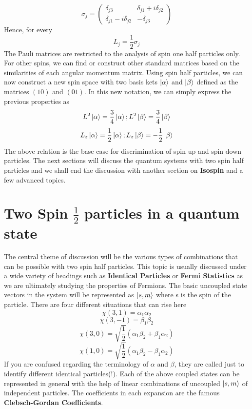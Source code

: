 \documentclass[12pt]{article}
\begin{document}
$$
\sigma_j = 
\begin{pmatrix} 
  \delta_{j3}     & \delta_{j1}+i\delta_{j2}\\ 
  \delta_{j1}-i\delta_{j2} & -\delta_{j3} 
\end{pmatrix}
$$
Hence, for every $$L_j = \frac{1}{2}\sigma_j$$ The Pauli matrices are restricted to the analysis of spin one half particles only. For other spins, we can find or construct other standard matrices based on the similarities of each angular momentum matrix. Using spin half particles, we can now construct a new spin space with two basis kets $\Ket{\alpha}$ and $\Ket{\beta}$ defined as the matrices $(1 0)$ and $(0 1)$. In this new notation, we can simply express the previous properties as $$L^2\Ket{\alpha} = \frac{3}{4}\Ket{\alpha} ; L^2\Ket{\beta} = \frac{3}{4}\Ket{\beta}$$
$$L_z\Ket{\alpha} = \frac{1}{2}\Ket{\alpha} ; L_z\Ket{\beta} = -\frac{1}{2}\Ket{\beta}$$ The above relation is the base case for discrimination of spin up and spin down particles. The next sections will discuss the quantum systems with two spin half particles and we shall end the discussion with another section on \textbf{Isospin} and a few advanced topics.

\section{Two Spin $\frac{1}{2}$ particles in a quantum state}

The central theme of discussion will be the various types of combinations that can be possible with two spin half particles. This topic is usually discussed under a wide variety of headings such as \textbf{Identical Particles} or \textbf{Fermi Statistics} as we are ultimately studying the properties of Fermions. The basic uncoupled state vectors in the system will be represented as $\Ket{s,m}$ where s is the spin of the particle. There are four different situations that can rise here
$$\chi(3,1) = \alpha_1\alpha_2$$
$$\chi(3,-1) = \beta_1\beta_2$$
$$\chi(3,0) = \sqrt{\frac{1}{2}}(\alpha_1\beta_2+\beta_1\alpha_2)$$
$$\chi(1,0) =  \sqrt{\frac{1}{2}}(\alpha_1\beta_2-\beta_1\alpha_2)$$
If you are confused regarding the terminology of $\alpha$ and $\beta$, they are called just to identify different identical particles(!). Each of the above coupled states can be represented in general with the help of linear combinations of uncoupled $\Ket{s,m}$ of independent particles. The coefficients in each expansion are the famous \textbf{Clebsch-Gordan Coefficients}. 
\end{document}
